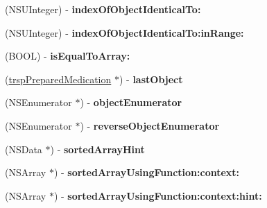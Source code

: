 \begin{DoxyCompactItemize}
\item 
\hypertarget{interfacesave_prepared_medications_aeba462918ff8ba2d2d50cde3781e9fb7}{}(N\+S\+U\+Integer) -\/ {\bfseries index\+Of\+Object\+Identical\+To\+:}\label{interfacesave_prepared_medications_aeba462918ff8ba2d2d50cde3781e9fb7}

\item 
\hypertarget{interfacesave_prepared_medications_a7e984d9809edd48c4bc53adc88daad9b}{}(N\+S\+U\+Integer) -\/ {\bfseries index\+Of\+Object\+Identical\+To\+:in\+Range\+:}\label{interfacesave_prepared_medications_a7e984d9809edd48c4bc53adc88daad9b}

\item 
\hypertarget{interfacesave_prepared_medications_ac612fa1209d376a296b6c98465ac6fe9}{}(B\+O\+O\+L) -\/ {\bfseries is\+Equal\+To\+Array\+:}\label{interfacesave_prepared_medications_ac612fa1209d376a296b6c98465ac6fe9}

\item 
\hypertarget{interfacesave_prepared_medications_aa22279d36e772d0a0c169fdf300b4f56}{}(\hyperlink{interfacetrsp_prepared_medication}{trsp\+Prepared\+Medication} $\ast$) -\/ {\bfseries last\+Object}\label{interfacesave_prepared_medications_aa22279d36e772d0a0c169fdf300b4f56}

\item 
\hypertarget{interfacesave_prepared_medications_ab457e39699344aefbdc3c58dc81717e7}{}(N\+S\+Enumerator $\ast$) -\/ {\bfseries object\+Enumerator}\label{interfacesave_prepared_medications_ab457e39699344aefbdc3c58dc81717e7}

\item 
\hypertarget{interfacesave_prepared_medications_a8306b8a64c86dbb2f68bf43136286661}{}(N\+S\+Enumerator $\ast$) -\/ {\bfseries reverse\+Object\+Enumerator}\label{interfacesave_prepared_medications_a8306b8a64c86dbb2f68bf43136286661}

\item 
\hypertarget{interfacesave_prepared_medications_a482e15be854c183168159cc6e112a646}{}(N\+S\+Data $\ast$) -\/ {\bfseries sorted\+Array\+Hint}\label{interfacesave_prepared_medications_a482e15be854c183168159cc6e112a646}

\item 
\hypertarget{interfacesave_prepared_medications_a5b28583db32ae8da88f4afb3b991cd5b}{}(N\+S\+Array $\ast$) -\/ {\bfseries sorted\+Array\+Using\+Function\+:context\+:}\label{interfacesave_prepared_medications_a5b28583db32ae8da88f4afb3b991cd5b}

\item 
\hypertarget{interfacesave_prepared_medications_a9f933450a96f427407cb0feb43f3eee5}{}(N\+S\+Array $\ast$) -\/ {\bfseries sorted\+Array\+Using\+Function\+:context\+:hint\+:}\label{interfacesave_prepared_medications_a9f933450a96f427407cb0feb43f3eee5}


\end{DoxyCompactItemize}
